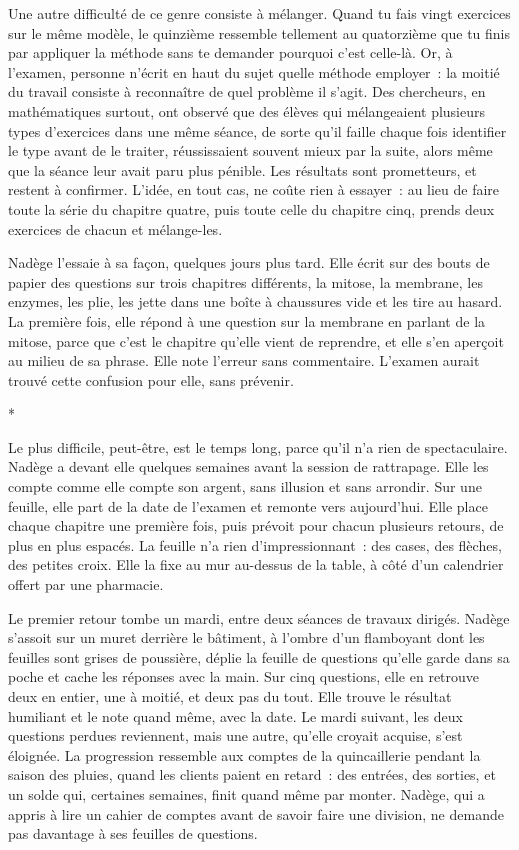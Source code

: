 \documentclass[10.5pt,twoside,openright]{book}
\newcommand{\asterisme}{\par\vspace{0.7em}\centerline{\color{gris}*\quad*\quad*}\vspace{0.7em}\par\noindent}
\begin{document}
Une autre difficulté de ce genre consiste à mélanger. Quand tu fais vingt exercices sur le même modèle, le quinzième ressemble tellement au quatorzième que tu finis par appliquer la méthode sans te demander pourquoi c’est celle-là. Or, à l’examen, personne n’écrit en haut du sujet quelle méthode employer : la moitié du travail consiste à reconnaître de quel problème il s’agit. Des chercheurs, en mathématiques surtout, ont observé que des élèves qui mélangeaient plusieurs types d’exercices dans une même séance, de sorte qu’il faille chaque fois identifier le type avant de le traiter, réussissaient souvent mieux par la suite, alors même que la séance leur avait paru plus pénible. Les résultats sont prometteurs, et restent à confirmer. L’idée, en tout cas, ne coûte rien à essayer : au lieu de faire toute la série du chapitre quatre, puis toute celle du chapitre cinq, prends deux exercices de chacun et mélange-les.

Nadège l’essaie à sa façon, quelques jours plus tard. Elle écrit sur des bouts de papier des questions sur trois chapitres différents, la mitose, la membrane, les enzymes, les plie, les jette dans une boîte à chaussures vide et les tire au hasard. La première fois, elle répond à une question sur la membrane en parlant de la mitose, parce que c’est le chapitre qu’elle vient de reprendre, et elle s’en aperçoit au milieu de sa phrase. Elle note l’erreur sans commentaire. L’examen aurait trouvé cette confusion pour elle, sans prévenir.

\asterisme

Le plus difficile, peut-être, est le temps long, parce qu’il n’a rien de spectaculaire. Nadège a devant elle quelques semaines avant la session de rattrapage. Elle les compte comme elle compte son argent, sans illusion et sans arrondir. Sur une feuille, elle part de la date de l’examen et remonte vers aujourd’hui. Elle place chaque chapitre une première fois, puis prévoit pour chacun plusieurs retours, de plus en plus espacés. La feuille n’a rien d’impressionnant : des cases, des flèches, des petites croix. Elle la fixe au mur au-dessus de la table, à côté d’un calendrier offert par une pharmacie.

Le premier retour tombe un mardi, entre deux séances de travaux dirigés. Nadège s’assoit sur un muret derrière le bâtiment, à l’ombre d’un flamboyant dont les feuilles sont grises de poussière, déplie la feuille de questions qu’elle garde dans sa poche et cache les réponses avec la main. Sur cinq questions, elle en retrouve deux en entier, une à moitié, et deux pas du tout. Elle trouve le résultat humiliant et le note quand même, avec la date. Le mardi suivant, les deux questions perdues reviennent, mais une autre, qu’elle croyait acquise, s’est éloignée. La progression ressemble aux comptes de la quincaillerie pendant la saison des pluies, quand les clients paient en retard : des entrées, des sorties, et un solde qui, certaines semaines, finit quand même par monter. Nadège, qui a appris à lire un cahier de comptes avant de savoir faire une division, ne demande pas davantage à ses feuilles de questions.
\end{document}
